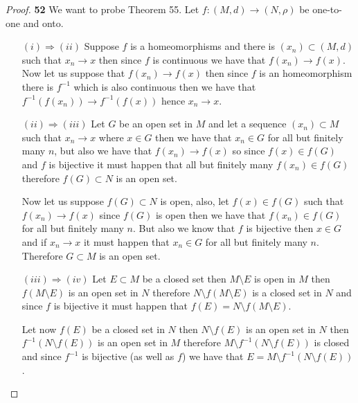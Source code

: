 \documentclass[11pt]{article}
\theoremstyle{definition}
\begin{document}
\cleardoublepage
    \begin{proof}{\textbf{52}}
        We want to probe Theorem 55. Let $f:(M,d)  \to (N,\rho)$ be one-to-one
        and onto.
        \begin{itemize}
            \item [$(i) \Rightarrow (ii)$] Suppose $f$ is a homeomorphisms and there is
            $(x_n) \subset (M,d)$ such that $x_n \to x$ then since $f$ is
            continuous we have that $f(x_n) \to f(x)$. Now let us suppose
            that $f(x_n) \to f(x)$ then since $f$ is an homeomorphism there is
            $f^{-1}$ which is also continuous then we have that
            $f^{-1}(f(x_n)) \to f^{-1}(f(x))$ hence $x_n \to x$.

            \item [$(ii) \Rightarrow (iii)$] Let $G$ be an open set in $M$ and let
            a sequence $(x_n) \subset M$ such that $x_n \to x$ where $x \in G$
            then we have that $x_n \in G$ for all but finitely many $n$, but
            also we have that $f(x_n) \to f(x)$ so since $f(x) \in f(G)$ and 
            $f$ is bijective it must happen that all but finitely many
            $f(x_n) \in f(G)$ therefore $f(G) \subset N$ is an open set.

            Now let us suppose $f(G) \subset N$ is open, also, let
            $f(x) \in f(G)$ such that  $f(x_n) \to f(x)$ since $f(G)$ is open
            then we have that $f(x_n) \in f(G)$ for all but finitely many $n$.
            But also we know that $f$ is bijective then $x \in G$ and if
            $x_n \to x$ it must happen that $x_n \in G$ for all but finitely
            many $n$. Therefore $G \subset M$ is an open set. 

            \item [$(iii) \Rightarrow (iv)$] Let $E \subset M$ be a closed set then
            $M \setminus E$ is open in $M$ then $f(M \setminus E)$ is an
            open set in $N$ therefore $N \setminus f(M \setminus E)$ is a
            closed set in $N$ and since $f$ is bijective it must happen that
            $f(E) = N \setminus f(M \setminus E)$.

            Let now $f(E)$ be a closed set in $N$ then $N \setminus f(E)$ is an
            open set in $N$ then $f^{-1}(N \setminus f(E))$ is an open set in
            $M$ therefore $M \setminus f^{-1}(N \setminus f(E))$ is closed and
            since $f^{-1}$ is bijective (as well as $f$) we have that
            $E = M \setminus f^{-1}(N \setminus f(E))$.


\end{itemize}
\end{proof}
\end{document}
